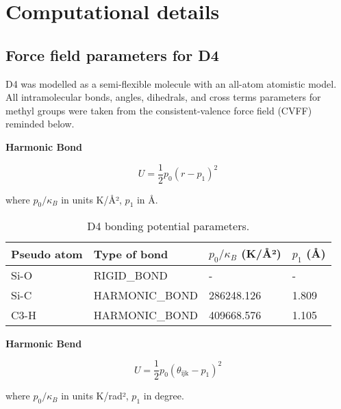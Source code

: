
\section{Computational details}\label{si-computational-details}

\subsection{Force field parameters for D4}\label{force-field-parameters-for-d4}

D4 was modelled as a semi-flexible molecule with an all-atom atomistic model.
All intramolecular bonds, angles, dihedrals, and cross terms parameters for
methyl groups were taken from the consistent-valence force field (CVFF) reminded below.
\citep{dauber-osguthorpeStructureEnergeticsLigand1988}

\textbf{Harmonic Bond}

\begin{equation}
    U = \frac{1}{2}p_{0}{(r - p_{1})}^{2}
\end{equation}

where \(p_0 / \kappa_B\) in units K/Å², \(p_{1}\) in Å. 

\begin{table}[H]
    \centering
    \caption{%
        D4 bonding potential parameters.
    }\label{tbl:ff-d4-bond}
    \begin{tabular}{@{}llll@{}}
        Pseudo atom & Type of bond & \(p_0 / \kappa_B\) (K/Å²) & \(p_{1}\) (Å) \\
        \midrule
        Si-O & RIGID\_BOND & - & -\\
        Si-C & HARMONIC\_BOND & 286248.126 & 1.809\\
        C3-H & HARMONIC\_BOND & 409668.576 & 1.105\\
        \bottomrule
    \end{tabular}
\end{table}

\textbf{Harmonic Bend}

\begin{equation}
    U = \frac{1}{2}p_{0}{(\theta_{\text{ijk}} - p_{1})}^{2}
\end{equation}

where \(p_0 / \kappa_B\) in units K/rad², \(p_{1}\) in degree.

